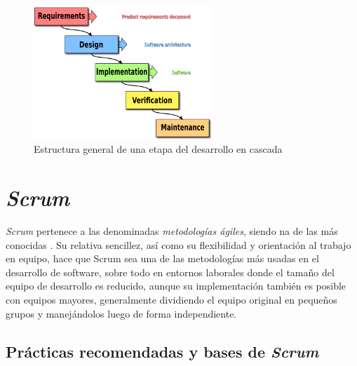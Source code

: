 \begin{figure}[H]
		\includegraphics[width=0.6\textwidth,height=0.6\textheight,keepaspectratio]{./img/Waterfall_model.png}
	\caption{Estructura general de una etapa del desarrollo en cascada}
	\label{fig:cascadadesarrollo}
\end{figure}

\section{\textit{Scrum}}

\textit{Scrum} pertenece a las denominadas \textit{metodologías ágiles}, siendo na de las más conocidas \cite{website:scrum}. Su relativa sencillez, así como su flexibilidad y orientación al trabajo en equipo, hace que Scrum sea una de las metodologías más usadas en el desarrollo de software, sobre todo en entornos laborales donde el tamaño del equipo de desarrollo es reducido, aunque su implementación también es posible con equipos mayores, generalmente dividiendo el equipo original en pequeños grupos y manejándolos luego de forma independiente.

\subsection{Prácticas recomendadas y bases de \textit{Scrum}}

